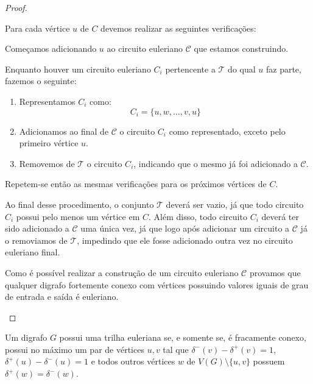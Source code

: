 \begin{proof}
\begin{enumerate}
            Para cada vértice $u$ de $C$ devemos realizar as seguintes verificações:

            \begin{tcolorbox}

                Começamos adicionando $u$ ao circuito euleriano $\mathcal{C}$ que estamos construindo.

                Enquanto houver um circuito euleriano $C_i$ pertencente a $\mathcal{T}$ do qual $u$ faz parte, fazemos o seguinte:


                \begin{enumerate}
                    \item Representamos $C_i$ como: 
                        \[
                            C_i = \{u, w, \dots, v, u\}
                        \]

                    \item Adicionamos ao final de $\mathcal{C}$ o circuito $C_i$ como representado, exceto pelo primeiro vértice $u$. 

                    \item Removemos de $\mathcal{T}$ o circuito $C_i$, indicando que o mesmo já foi adicionado a $\mathcal{C}$.

                \end{enumerate}

                Repetem-se então as mesmas verificações para os próximos vértices de $C$.
            \end{tcolorbox}


Ao final desse procedimento, o conjunto $\mathcal{T}$ deverá ser vazio, já que todo circuito $C_i$ possui pelo menos um vértice em $C$. Além disso, todo circuito $C_i$ deverá ter sido adicionado a $\mathcal{C}$ uma única vez, já que logo após adicionar um circuito a $\mathcal{C}$ já o removiamos de $\mathcal{T}$, impedindo que ele fosse adicionado outra vez no circuito euleriano final.

Como é possível realizar a construção de um circuito euleriano $\mathcal{C}$ provamos que qualquer digrafo fortemente conexo com vértices possuindo valores iguais de grau de entrada e saída é euleriano.

    \end{enumerate}
\end{proof}

\begin{corollary} 
    Um digrafo $G$ possui uma trilha euleriana se, e somente se, é fracamente conexo, possui no máximo um par de vértices $u, v$ tal que $\delta^-(v) - \delta^+(v) = 1$, $\delta^+(u) - \delta^-(u) = 1$ e todos outros vértices $w$ de $V(G) \setminus \{u, v\}$ possuem $\delta^+(w) = \delta^-(w)$.
    \label{corollary-euler-digraph}
\end{corollary}

